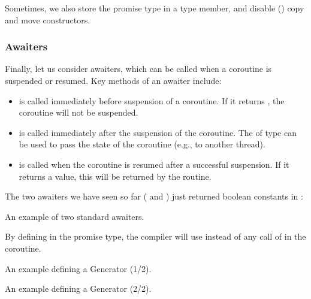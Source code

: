 \begin{itemize}
\begin{end}
Sometimes, we also store the promise type in a  type member, and disable () copy and move constructors. 

\subsubsection{Awaiters}

Finally, let us consider awaiters, which can be called when a coroutine is suspended or resumed. 
Key methods of an awaiter include:
\begin{itemize}
\item {} is called immediately before suspension of a coroutine. If it returns , the coroutine will not be suspended. 
\item {} is called immediately after the suspension of the coroutine. The  of type  can be used to pass the state of the coroutine (e.g., to another thread). 
\item {} is called when the coroutine is resumed after a successful suspension. If it returns a value, this will be returned by the  routine. 
\end{itemize}
The two awaiters we have seen so far ( and ) just returned boolean constants in :

\raggedbottom
\begin{codebox}[]{\href{https://godbolt.org/z/sK884T7hh}{\ExternalLink}}
\footnotesize An example of two standard awaiters.
\tcblower
{}
\end{codebox}

By defining  in the promise type, the compiler will use  instead of any call of  in the coroutine. 

\raggedbottom
\begin{codebox}[]{\href{https://godbolt.org/z/WKn5h181v}{\ExternalLink}}
\footnotesize An example defining a Generator (1/2).
\tcblower
{}
\end{codebox}

\raggedbottom
\begin{codebox}[]{\href{https://godbolt.org/z/WKn5h181v}{\ExternalLink}}
\footnotesize An example defining a Generator (2/2).
\tcblower
{}
\end{codebox}


\end{end}
\end{itemize}
